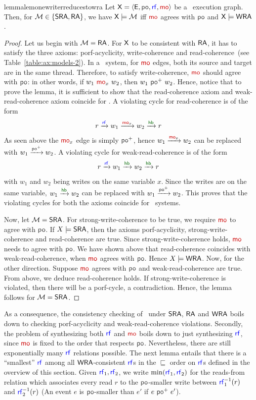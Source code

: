 \begin{restatable}{lemma}{lemonewriterreducestowra}
    \label{lem:one-writer-reduces-to-wra}
 Let $\ex = \tuple{\E, \po, \rf, \mo}$ be a \onewriter\ execution graph. Then, for $\mathcal{M} \in \{\mathsf{SRA}, \mathsf{RA}\}$, we have $\mathsf{\color{black}X} \models \mathcal{M}$ iff $\mo$ agrees with $\po$ and $\mathsf{\color{black}X} \models \mathsf{WRA}$. 
\end{restatable}
\begin{proof}
    Let us begin with $\mathcal{M} = \mathsf{RA}$. For $\mathsf{\color{black}X}$ to be consistent with $\mathsf{RA}$, it has to satisfy the three axioms: porf-acyclicity, write-coherence and read-coherence~(see Table~\ref{table:ax:models-2}). In a \onewriter\ system, for $\mo$ edges, both its source and target are in the same thread. Therefore, to satisfy write-coherence, $\mo$ should agree with $\po$: in other words, if $w_1~\mo_x~w_2$, then $w_1~\po^+~w_2$. Hence, notice that to prove the lemma, it is sufficient to show that the read-coherence axiom and weak-read-coherence axiom coincide for \onewriter. A violating cycle for read-coherence is of the form
    \[r \xra{\rf} w_1 \xra{\mo_x} w_2 \xra{\hb} r\]
    As seen above the $\mo_x$ edge is simply $\po^+$, hence $w_1 \xra{\mo_x} w_2$ can be replaced with $w_1 \xra{\po^+} w_2$. A violating cycle for weak-read-coherence is of the form
    \[r \xra{\rf} w_1 \xra{\hb} w_2 \xra{\hb} r\]
    with $w_1$ and $w_2$ being writes on the same variable $x$. Since the writes are on the same variable, $w_1 \xra{\hb} w_2$ can be replaced with $w_1 \xra{\po^+} w_2$. This proves that the violating cycles for both the axioms coincide for \onewriter\ systems.

    Now, let $\mathcal{M} = \mathsf{SRA}$. For strong-write-coherence to be true, we require $\mo$ to agree with $\po$. If $X \models \mathsf{SRA}$, then the axioms porf-acyclicity, strong-write-coherence and read-coherence are true. Since strong-write-coherence holds, $\mo$ needs to agree with $\po$. We have shown above that read-coherence coincides with weak-read-coherence, when $\mo$ agrees with $\po$. Hence $X \models \mathsf{WRA}$. Now, for the other direction. Suppose $\mo$ agrees with $\po$ and weak-read-coherence are true. From above, we deduce read-coherence holds. If strong-write-coherence is violated, then there will be a porf-cycle, a contradiction. Hence, the lemma follows for $\mathcal{M} = \mathsf{SRA}$.
\end{proof}
As a consequence, the consistency checking of \onewriter\ under $\mathsf{SRA}$, $\mathsf{RA}$ and $\mathsf{WRA}$ boils down to checking porf-acyclicity and weak-read-coherence violations.
Secondly, the problem of synthesizing both $\rf$ and $\mo$ boils down to just synthesizing $\rf$, since $\mo$ is fixed to the order that respects $\po$. Nevertheless, there are still exponentially many $\rf$ relations possible. The next lemma entails that there is a ``smallest'' $\rf$ among all $\mathsf{WRA}$-consistent $\rf$s in the $\sqsubseteq$ order on $\rf$s defined in the overview of this section. Given $\rf_1, \rf_2$, we write $\min(\rf_1, \rf_2)$ for the reads-from relation which associates every read $r$ to the $\po$-smaller write between $\rf^{-1}_1(r)$ and $\rf^{-1}_2(r)$ (An event $e$ is $\po$-smaller than $e'$ if $e~\po^+~e'$). 


